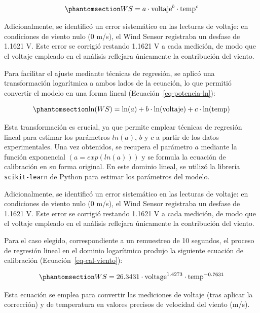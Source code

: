 \documentclass[
  letterpaper,
]{scrbook}
\begin{document}
\begin{equation}\phantomsection\label{eq-potencia}{
WS = a \cdot \text{voltaje}^b \cdot \text{temp}^c
}\end{equation}

Adicionalmente, se identificó un error sistemático en las lecturas de
voltaje: en condiciones de viento nulo (0 m/s), el Wind Sensor
registraba un desfase de 1.1621 V. Este error se corrigió restando
1.1621 V a cada medición, de modo que el voltaje empleado en el análisis
reflejara únicamente la contribución del viento.

Para facilitar el ajuste mediante técnicas de regresión, se aplicó una
transformación logarítmica a ambos lados de la ecuación, lo que permitió
convertir el modelo en una forma lineal (Ecuación~\ref{eq-potencia-ln}):

\begin{equation}\phantomsection\label{eq-potencia-ln}{
\ln(WS) = \ln(a) + b \cdot \ln(\text{voltaje}) + c \cdot \ln(\text{temp})
}\end{equation}

Esta transformación es crucial, ya que permite emplear técnicas de
regresión lineal para estimar los parámetros \(ln(a)\), \(b\) y \(c\) a
partir de los datos experimentales. Una vez obtenidos, se recupera el
parámetro \(a\) mediante la función exponencial \((a = exp(ln(a)))\) y
se formula la ecuación de calibración en su forma original. En este
dominio lineal, se utilizó la librería \texttt{scikit-learn} de Python
para estimar los parámetros del modelo.

Adicionalmente, se identificó un error sistemático en las lecturas de
voltaje: en condiciones de viento nulo (0 m/s), el Wind Sensor
registraba un desfase de 1.1621 V. Este error se corrigió restando
1.1621 V a cada medición, de modo que el voltaje empleado en el análisis
reflejara únicamente la contribución del viento.

Para el caso elegido, correspondiente a un remuestreo de 10 segundos, el
proceso de regresión lineal en el dominio logarítmico produjo la
siguiente ecuación de calibración (Ecuación~\ref{eq-cal-viento}):

\begin{equation}\phantomsection\label{eq-cal-viento}{
WS = 26.3431 \cdot \text{voltage}^{1.4273} \cdot \text{temp}^{-0.7631}
}\end{equation}

Esta ecuación se emplea para convertir las mediciones de voltaje (tras
aplicar la corrección) y de temperatura en valores precisos de velocidad
del viento (m/s).
\end{document}

